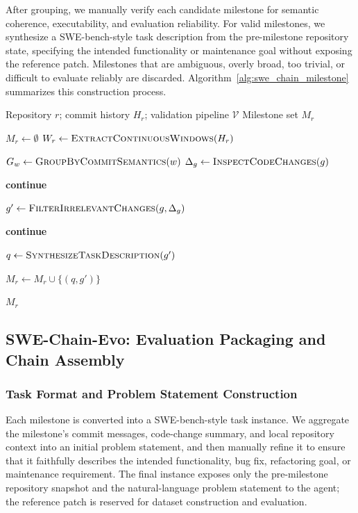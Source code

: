 \documentclass{article}
\begin{document}
After grouping, we manually verify each candidate milestone for semantic coherence, executability, and evaluation reliability. For valid milestones, we synthesize a SWE-bench-style task description from the pre-milestone repository state, specifying the intended functionality or maintenance goal without exposing the reference patch. Milestones that are ambiguous, overly broad, too trivial, or difficult to evaluate reliably are discarded. Algorithm~\ref{alg:swe_chain_milestone} summarizes this construction process.

\begin{algorithm}[t]
\caption{Milestone Construction for SWE-Chain-Evo}
\label{alg:swe_chain_milestone}
\begin{algorithmic}[1]
\Require Repository $r$; commit history $H_r$; validation pipeline $\mathcal{V}$
\Ensure Milestone set $M_r$

\State $M_r \gets \emptyset$
\State $W_r \gets \textsc{ExtractContinuousWindows}(H_r)$

    \State $G_w \gets \textsc{GroupByCommitSemantics}(w)$
        \State $\Delta_g \gets \textsc{InspectCodeChanges}(g)$

            \State \textbf{continue}
        \EndIf

        \State $g' \gets \textsc{FilterIrrelevantChanges}(g,\Delta_g)$

            \State \textbf{continue}
        \EndIf

        \State $q \gets \textsc{SynthesizeTaskDescription}(g')$

            \State $M_r \gets M_r \cup \{(q,g')\}$
        \EndIf
    \EndFor
\EndFor

\State \Return $M_r$
\end{algorithmic}
\end{algorithm}



\subsection{SWE-Chain-Evo: Evaluation Packaging and Chain Assembly}
\label{app:swe_evaluation}

\subsubsection{Task Format and Problem Statement Construction}
\label{app:swe_task_format}
Each milestone is converted into a SWE-bench-style task instance. We aggregate the milestone's commit messages, code-change summary, and local repository context into an initial problem statement, and then manually refine it to ensure that it faithfully describes the intended functionality, bug fix, refactoring goal, or maintenance requirement. The final instance exposes only the pre-milestone repository snapshot and the natural-language problem statement to the agent; the reference patch is reserved for dataset construction and evaluation.
\end{document}

